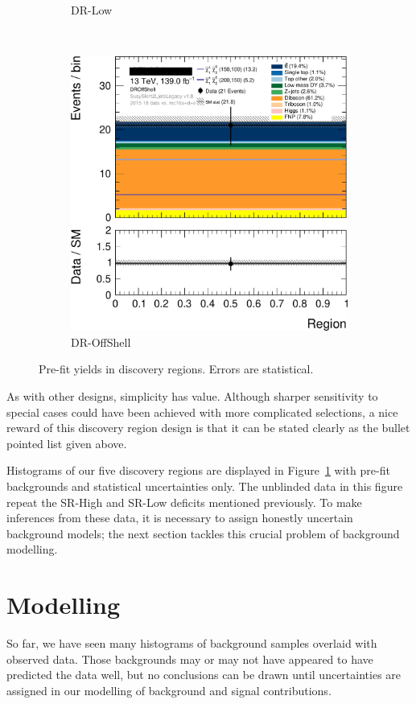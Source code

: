 \begin{figure}[tp]
\begin{subfigure}{0.46\textwidth}
\caption{DR-Low}
\end{subfigure}
\\[0.5em]
\begin{subfigure}{0.46\textwidth}
\centering
\includegraphics[width=\textwidth]{figures/2ljets_disco_plot_DROffShell.png}
\caption{DR-OffShell}
\end{subfigure}
\caption[
Pre-fit yields in discovery regions
]{%
Pre-fit yields in discovery regions.
Errors are statistical.
}
\label{fig:2ljets_disco_prefit}
\end{figure}

As with other designs, simplicity has value.
Although sharper sensitivity to special cases could have been achieved
with more complicated selections, a nice reward of this discovery region design
is that it can be stated clearly as the bullet pointed list given above.

Histograms of our five discovery regions are displayed in
Figure~\ref{fig:2ljets_disco_prefit}
with pre-fit backgrounds and statistical uncertainties only.
The unblinded data in this figure repeat the SR-High and SR-Low deficits
mentioned previously.
To make inferences from these data, it is necessary to assign honestly
uncertain background models; the next section tackles this crucial problem of
background modelling.

\section{Modelling}
\label{sec:2ljets_modelling}
So far, we have seen many histograms of background samples overlaid with
observed data.
Those backgrounds may or may not have appeared to have predicted the data well,
but no conclusions can be drawn until uncertainties are assigned in our
modelling of background and signal contributions.

